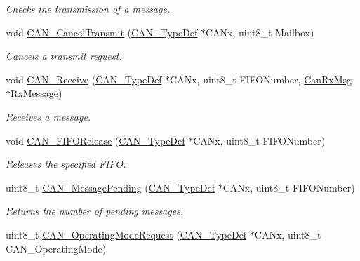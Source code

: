 \begin{DoxyCompactItemize}
\begin{DoxyCompactList}\small\item\em Checks the transmission of a message. \end{DoxyCompactList}\item 
void \mbox{\hyperlink{group___c_a_n___exported___functions_ga81106cdf5395a1947bfc87ec1685829e}{C\+A\+N\+\_\+\+Cancel\+Transmit}} (\mbox{\hyperlink{struct_c_a_n___type_def}{C\+A\+N\+\_\+\+Type\+Def}} $\ast$C\+A\+Nx, uint8\+\_\+t Mailbox)
\begin{DoxyCompactList}\small\item\em Cancels a transmit request. \end{DoxyCompactList}\item 
void \mbox{\hyperlink{group___c_a_n___exported___functions_ga351b90bb8a3bb0c846f85bbd56ef4dc8}{C\+A\+N\+\_\+\+Receive}} (\mbox{\hyperlink{struct_c_a_n___type_def}{C\+A\+N\+\_\+\+Type\+Def}} $\ast$C\+A\+Nx, uint8\+\_\+t F\+I\+F\+O\+Number, \mbox{\hyperlink{struct_can_rx_msg}{Can\+Rx\+Msg}} $\ast$Rx\+Message)
\begin{DoxyCompactList}\small\item\em Receives a message. \end{DoxyCompactList}\item 
void \mbox{\hyperlink{group___c_a_n___exported___functions_ga1bc3b39471e579b4101624c33d27918b}{C\+A\+N\+\_\+\+F\+I\+F\+O\+Release}} (\mbox{\hyperlink{struct_c_a_n___type_def}{C\+A\+N\+\_\+\+Type\+Def}} $\ast$C\+A\+Nx, uint8\+\_\+t F\+I\+F\+O\+Number)
\begin{DoxyCompactList}\small\item\em Releases the specified F\+I\+FO. \end{DoxyCompactList}\item 
uint8\+\_\+t \mbox{\hyperlink{group___c_a_n___exported___functions_ga7100459a95ce1b3cfe8ab15e112029fe}{C\+A\+N\+\_\+\+Message\+Pending}} (\mbox{\hyperlink{struct_c_a_n___type_def}{C\+A\+N\+\_\+\+Type\+Def}} $\ast$C\+A\+Nx, uint8\+\_\+t F\+I\+F\+O\+Number)
\begin{DoxyCompactList}\small\item\em Returns the number of pending messages. \end{DoxyCompactList}\item 
uint8\+\_\+t \mbox{\hyperlink{group___c_a_n___exported___functions_gab2a3630e9e3024114eb117d14e514208}{C\+A\+N\+\_\+\+Operating\+Mode\+Request}} (\mbox{\hyperlink{struct_c_a_n___type_def}{C\+A\+N\+\_\+\+Type\+Def}} $\ast$C\+A\+Nx, uint8\+\_\+t C\+A\+N\+\_\+\+Operating\+Mode)

\end{DoxyCompactItemize}
